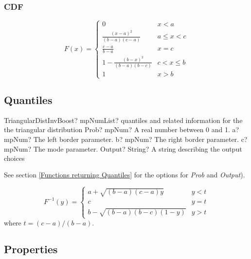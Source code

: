 \subsubsection{CDF}
\label{TriangularDistributionCDF}

\begin{equation}
	F(x)=\begin{cases}
		0  & x<a\\
		\frac{(x-a)^2}{(b-a)(c-a)} & a \leq x < c\\
		\frac{c-a}{b-a} & x = c\\
		1-\frac{(b-x)^2}{(b-a)(b-c)} & c < x \leq b\\
		1  & x>b
	\end{cases}
\end{equation}



\subsection{Quantiles}

\begin{mpFunctionsExtract}
	\mpFunctionFiveNotImplemented
	{TriangularDistInvBoost? mpNumList? quantiles and related information for the the triangular distribution}
	{Prob? mpNum? A real number between 0 and 1.}
	{a? mpNum? The left border parameter.}
	{b? mpNum? The right border parameter.}
	{c? mpNum? The mode parameter.}
	{Output? String? A string describing the output choices}
\end{mpFunctionsExtract}

\vspace{0.3cm}
See section \ref{Functions returning Quantiles} for the options for  {\itshape\sffamily Prob} and {\itshape\sffamily Output}). 

\vspace{0.3cm}
\begin{equation}
	F^{-1}(y)=\begin{cases}
		a+\sqrt{(b-a)(c-a)y} & y<t\\
		c & y=t \\
		b-\sqrt{(b-a)(b-c)(1-y)} & y>t
	\end{cases}
\end{equation}
where $t=(c-a)/(b-a)$.


\subsection{Properties}
\label{TriangularDistributionProperties}


